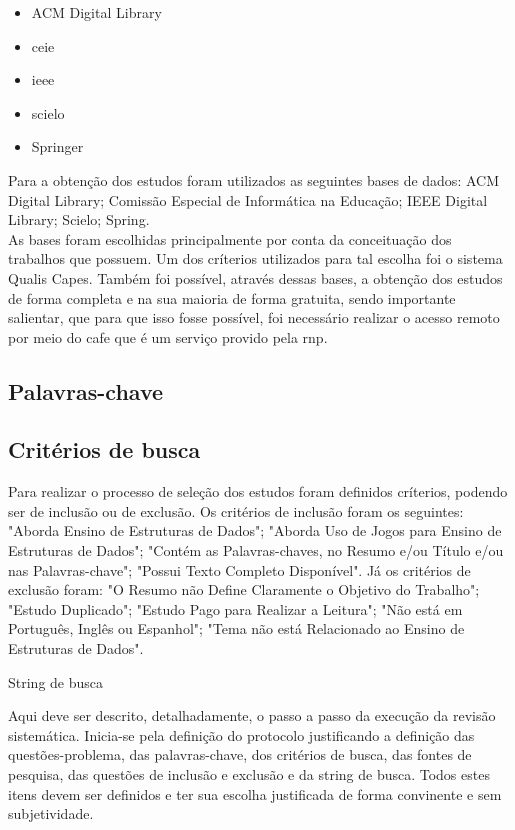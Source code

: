 \documentclass[12pt]{article}
\begin{document}
\begin{itemize}
    \item{ACM Digital Library}
    \item{\gls{ceie}}
    \item{\gls{ieee}}
    \item{\gls{scielo}}
    \item{Springer}
\end{itemize}

Para a obtenção dos estudos foram utilizados as seguintes bases de dados: ACM Digital Library; Comissão Especial de Informática na Educação; IEEE Digital Library; Scielo; Spring.\\
As bases foram escolhidas principalmente por conta da conceituação dos trabalhos que possuem. Um dos críterios utilizados para tal escolha foi o sistema Qualis Capes. Também foi possível, através dessas bases, a obtenção dos estudos de forma completa e na sua maioria de forma gratuita, sendo importante salientar, que para que isso fosse possível, foi necessário realizar o acesso remoto por meio do \gls{cafe} que é um serviço provido pela \gls{rnp}.

\subsection{Palavras-chave}

\subsection{Critérios de busca}


Para realizar o processo de seleção dos estudos foram definidos críterios, podendo ser de inclusão ou de exclusão. Os critérios de inclusão foram os seguintes: "Aborda Ensino de Estruturas de Dados"; "Aborda Uso de Jogos para Ensino de Estruturas de Dados"; "Contém as Palavras-chaves, no Resumo e/ou Título e/ou nas Palavras-chave"; "Possui Texto Completo Disponível". Já os critérios de exclusão foram: "O Resumo não Define Claramente o Objetivo do Trabalho"; "Estudo Duplicado"; "Estudo Pago para Realizar a Leitura"; "Não está em Português, Inglês ou Espanhol"; "Tema não está Relacionado ao Ensino de Estruturas de Dados".

String de busca


Aqui deve ser descrito, detalhadamente, o passo a passo da execução da revisão sistemática. Inicia-se pela definição do protocolo justificando a definição das questões-problema, das palavras-chave, dos critérios de busca, das fontes de pesquisa, das questões de inclusão e exclusão e da string de busca. Todos estes itens devem ser definidos e ter sua escolha justificada de forma convinente e sem subjetividade.
\end{document}
